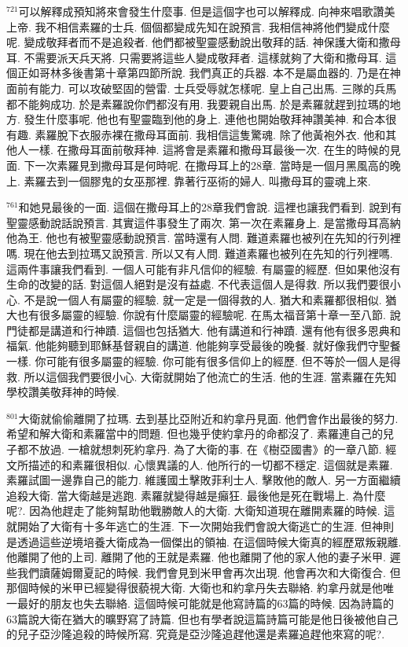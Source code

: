\documentclass{book}
\begin{document}
$^{721}$可以解釋成預知將來會發生什麼事.
但是這個字也可以解釋成.
向神來唱歌讚美上帝.
我不相信素羅的士兵.
個個都變成先知在說預言.
我相信神將他們變成什麼呢.
變成敬拜者而不是追殺者.
他們都被聖靈感動說出敬拜的話.
神保護大衛和撒母耳.
不需要派天兵天將.
只需要將這些人變成敬拜者.
這樣就夠了大衛和撒母耳.
這個正如哥林多後書第十章第四節所說.
我們真正的兵器.
本不是屬血器的.
乃是在神面前有能力.
可以攻破堅固的營雷.
士兵受辱就怎樣呢.
皇上自己出馬.
三隊的兵馬都不能夠成功.
於是素羅說你們都沒有用.
我要親自出馬.
於是素羅就趕到拉瑪的地方.
發生什麼事呢.
他也有聖靈臨到他的身上.
連他也開始敬拜神讚美神.
和合本很有趣.
素羅脫下衣服赤裸在撒母耳面前.
我相信這隻驚魂.
除了他黃袍外衣.
他和其他人一樣.
在撒母耳面前敬拜神.
這將會是素羅和撒母耳最後一次.
在生的時候的見面.
下一次素羅見到撒母耳是何時呢.
在撒母耳上的28章.
當時是一個月黑風高的晚上.
素羅去到一個膠鬼的女巫那裡.
靠著行巫術的婦人.
叫撒母耳的靈魂上來.

$^{761}$和她見最後的一面.
這個在撒母耳上的28章我們會說.
這裡也讓我們看到.
說到有聖靈感動說話說預言.
其實這件事發生了兩次.
第一次在素羅身上.
是當撒母耳高納他為王.
他也有被聖靈感動說預言.
當時還有人問.
難道素羅也被列在先知的行列裡嗎.
現在他去到拉瑪又說預言.
所以又有人問.
難道素羅也被列在先知的行列裡嗎.
這兩件事讓我們看到.
一個人可能有非凡信仰的經驗.
有屬靈的經歷.
但如果他沒有生命的改變的話.
對這個人絕對是沒有益處.
不代表這個人是得救.
所以我們要很小心.
不是說一個人有屬靈的經驗.
就一定是一個得救的人.
猶大和素羅都很相似.
猶大也有很多屬靈的經驗.
你說有什麼屬靈的經驗呢.
在馬太福音第十章一至八節.
說門徒都是講道和行神蹟.
這個也包括猶大.
他有講道和行神蹟.
還有他有很多恩典和福氣.
他能夠聽到耶穌基督親自的講道.
他能夠享受最後的晚餐.
就好像我們守聖餐一樣.
你可能有很多屬靈的經驗.
你可能有很多信仰上的經歷.
但不等於一個人是得救.
所以這個我們要很小心.
大衛就開始了他流亡的生活.
他的生涯.
當素羅在先知學校讚美敬拜神的時候.

$^{801}$大衛就偷偷離開了拉瑪.
去到基比亞附近和約拿丹見面.
他們會作出最後的努力.
希望和解大衛和素羅當中的問題.
但也幾乎使約拿丹的命都沒了.
素羅連自己的兒子都不放過.
一槍就想刺死約拿丹.
為了大衛的事.
在《樹亞國書》的一章八節.
經文所描述的和素羅很相似.
心懷異議的人.
他所行的一切都不穩定.
這個就是素羅.
素羅試圖一邊靠自己的能力.
維護國土擊敗菲利士人.
擊敗他的敵人.
另一方面繼續追殺大衛.
當大衛越是逃跑.
素羅就變得越是癲狂.
最後他是死在戰場上.
為什麼呢?.
因為他趕走了能夠幫助他戰勝敵人的大衛.
大衛知道現在離開素羅的時候.
這就開始了大衛有十多年逃亡的生涯.
下一次開始我們會說大衛逃亡的生涯.
但神則是透過這些逆境培養大衛成為一個傑出的領袖.
在這個時候大衛真的經歷眾叛親離.
他離開了他的上司.
離開了他的王就是素羅.
他也離開了他的家人他的妻子米甲.
遲些我們讀薩姆爾夏記的時候.
我們會見到米甲會再次出現.
他會再次和大衛復合.
但那個時候的米甲已經變得很藐視大衛.
大衛也和約拿丹失去聯絡.
約拿丹就是他唯一最好的朋友也失去聯絡.
這個時候可能就是他寫詩篇的63篇的時候.
因為詩篇的63篇說大衛在猶大的曠野寫了詩篇.
但也有學者說這篇詩篇可能是他日後被他自己的兒子亞沙隆追殺的時候所寫.
究竟是亞沙隆追趕他還是素羅追趕他來寫的呢?.
\end{document}
